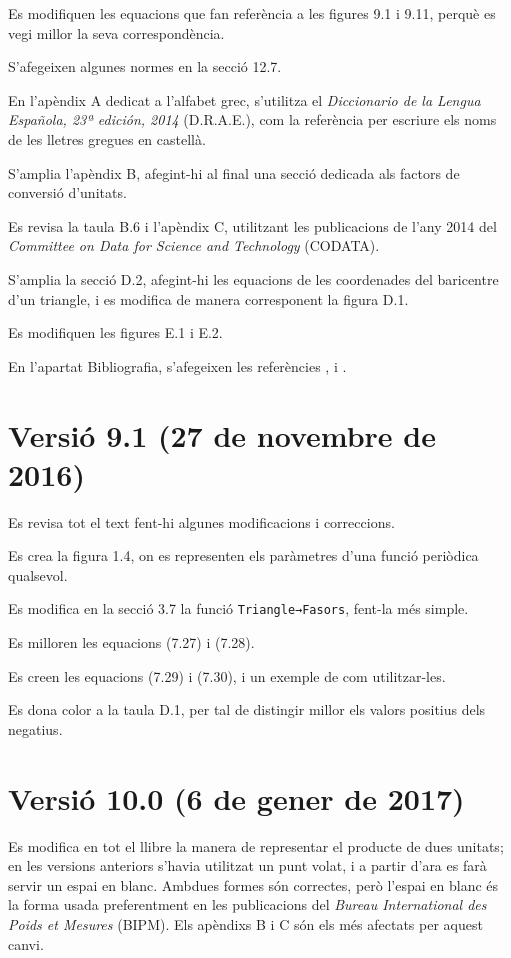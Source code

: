 Es modifiquen les equacions que fan referència a les figures 9.1 i 9.11, perquè es vegi millor la seva correspondència.

S'afegeixen algunes normes en la secció 12.7.

En l'apèndix A dedicat a l'alfabet grec, s'utilitza el  
\textit{Diccionario de la Lengua Española, 23ª
edición, 2014} (D.R.A.E.), com la referència per escriure els noms de les lletres gregues en castellà.

S'amplia l'apèndix B, afegint-hi al final una secció dedicada als factors de conversió d'unitats.

Es revisa la taula B.6 i l'apèndix C, utilitzant les publicacions de l'any 2014 del \textit{Committee on Data for Science and Technology} (CODATA).


S'amplia la secció D.2, afegint-hi les equacions de les coordenades del baricentre d'un triangle, i es modifica de manera corresponent la figura D.1.

Es modifiquen les figures E.1 i E.2.

En l'apartat Bibliografia, s'afegeixen les referències \cite{VOS}, \cite{WMF} i \cite{TRA}.


\section*{Versió 9.1 (27 de novembre de 2016)}

Es revisa tot el text fent-hi algunes  modificacions i correccions.

Es crea la figura 1.4, on es representen els paràmetres d'una funció periòdica qualsevol.

Es modifica en la secció 3.7 la funció \texttt{Triangle→Fasors}, fent-la més simple.

Es milloren les equacions (7.27) i (7.28).

Es creen les equacions (7.29) i (7.30), i un exemple de com utilitzar-les.

Es dona color a la taula D.1, per tal de distingir millor els valors positius dels negatius.

\section*{Versió 10.0 (6 de gener de 2017)}

Es modifica en tot el llibre la manera de representar el producte de dues unitats; en les versions anteriors s'havia utilitzat un punt volat, i a partir d'ara es farà servir un espai en blanc. Ambdues formes són correctes, però l'espai en blanc és la forma usada preferentment en les publicacions del  \textit{Bureau International des Poids et Mesures} (BIPM). Els apèndixs B i C són els més afectats per aquest canvi.

